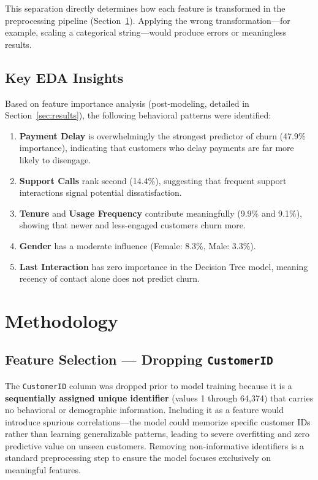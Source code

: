 \documentclass[12pt, a4paper]{article}
\begin{document}
This separation directly determines how each feature is transformed in the preprocessing pipeline (Section~\ref{sec:methodology}). Applying the wrong transformation---for example, scaling a categorical string---would produce errors or meaningless results.

\subsection{Key EDA Insights}

Based on feature importance analysis (post-modeling, detailed in Section~\ref{sec:results}), the following behavioral patterns were identified:

\begin{enumerate}
    \item \textbf{Payment Delay} is overwhelmingly the strongest predictor of churn (47.9\% importance), indicating that customers who delay payments are far more likely to disengage.
    \item \textbf{Support Calls} rank second (14.4\%), suggesting that frequent support interactions signal potential dissatisfaction.
    \item \textbf{Tenure} and \textbf{Usage Frequency} contribute meaningfully (9.9\% and 9.1\%), showing that newer and less-engaged customers churn more.
    \item \textbf{Gender} has a moderate influence (Female: 8.3\%, Male: 3.3\%).
    \item \textbf{Last Interaction} has zero importance in the Decision Tree model, meaning recency of contact alone does not predict churn.
\end{enumerate}

\section{Methodology}
\label{sec:methodology}

\subsection{Feature Selection --- Dropping \texttt{CustomerID}}

The \texttt{CustomerID} column was dropped prior to model training because it is a \textbf{sequentially assigned unique identifier} (values 1 through 64,374) that carries no behavioral or demographic information. Including it as a feature would introduce spurious correlations---the model could memorize specific customer IDs rather than learning generalizable patterns, leading to severe overfitting and zero predictive value on unseen customers. Removing non-informative identifiers is a standard preprocessing step to ensure the model focuses exclusively on meaningful features.
\end{document}
